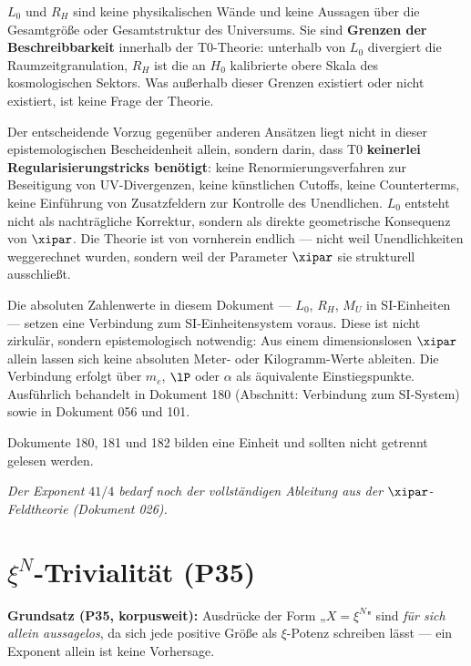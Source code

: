 \begin{foundation}
$L_0$ und $R_H$ sind keine physikalischen Wände und keine Aussagen über die Gesamtgröße oder Gesamtstruktur des Universums. Sie sind \textbf{Grenzen der Beschreibbarkeit} innerhalb der T0-Theorie: unterhalb von $L_0$ divergiert die Raumzeitgranulation, $R_H$ ist die an $H_0$ kalibrierte obere Skala des kosmologischen Sektors. Was außerhalb dieser Grenzen existiert oder nicht existiert, ist keine Frage der Theorie.

Der entscheidende Vorzug gegenüber anderen Ansätzen liegt nicht in dieser epistemologischen Bescheidenheit allein, sondern darin, dass T0 \textbf{keinerlei Regularisierungstricks benötigt}: keine Renormierungsverfahren zur Beseitigung von UV-Divergenzen, keine künstlichen Cutoffs, keine Counterterms, keine Einführung von Zusatzfeldern zur Kontrolle des Unendlichen. $L_0$ entsteht nicht als nachträgliche Korrektur, sondern als direkte geometrische Konsequenz von $\xipar$. Die Theorie ist von vornherein endlich — nicht weil Unendlichkeiten weggerechnet wurden, sondern weil der Parameter $\xipar$ sie strukturell ausschließt.
\end{foundation}

\begin{foundation}
Die absoluten Zahlenwerte in diesem Dokument — $L_0$, $R_H$, $M_U$ in SI-Einheiten — setzen eine Verbindung zum SI-Einheitensystem voraus. Diese ist nicht zirkulär, sondern epistemologisch notwendig: Aus einem dimensionslosen $\xipar$ allein lassen sich keine absoluten Meter- oder Kilogramm-Werte ableiten. Die Verbindung erfolgt über $m_e$, $\lP$ oder $\alpha$ als äquivalente Einstiegspunkte. Ausführlich behandelt in Dokument 180 (Abschnitt: Verbindung zum SI-System) sowie in Dokument 056 und 101.

Dokumente 180, 181 und 182 bilden eine Einheit und sollten nicht getrennt gelesen werden.
\end{foundation}

\vspace{1cm}
\noindent\textit{Der Exponent $41/4$ bedarf noch der vollständigen Ableitung aus der $\xipar$-Feldtheorie (Dokument 026).}

\section*{$\xi^N$-Trivialität (P35)}

\textbf{Grundsatz (P35, korpusweit):}
Ausdrücke der Form „$X = \xi^N$" sind \emph{für sich allein aussagelos},
da sich jede positive Größe als $\xi$-Potenz schreiben lässt --- ein Exponent
allein ist keine Vorhersage.

